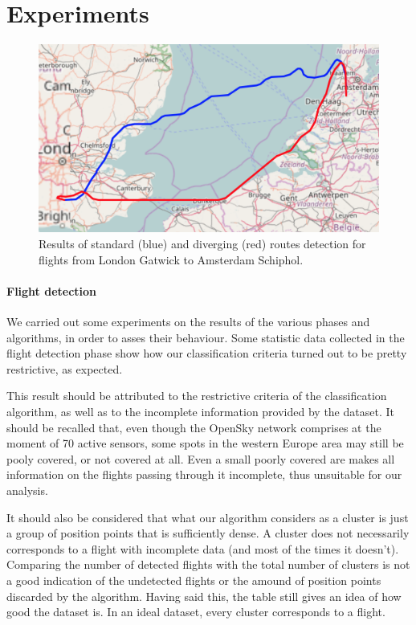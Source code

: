 \documentclass{vldb}
\begin{document}
\section{Experiments}

\begin{figure}[t]
  \centering
  \includegraphics[scale=0.4]{imgs/gatwick-schiphol.png}
  \caption{Results of standard (blue) and diverging (red) routes detection for
    flights from London Gatwick to Amsterdam Schiphol.}
  \label{fig:gatwick-schiphol}
\end{figure}

\paragraph{Flight detection}

We carried out some experiments on the results of the various phases and
algorithms, in order to asses their behaviour. Some statistic data collected in
the flight detection phase show how our classification criteria turned out to be
pretty restrictive, as expected.

This result should be attributed to the restrictive criteria of the
classification algorithm, as well as to the incomplete information provided by
the dataset. It should be recalled that, even though the OpenSky network
comprises at the moment of 70 active sensors, some spots in the western Europe
area may still be pooly covered, or not covered at all. Even a small poorly
covered are makes all information on the flights passing through it incomplete,
thus unsuitable for our analysis.

It should also be considered that what our algorithm considers as a cluster is
just a group of position points that is sufficiently dense. A cluster does not
necessarily corresponds to a flight with incomplete data (and most of the times
it doesn't). Comparing the number of detected flights with the total number of
clusters is not a good indication of the undetected flights or the amound of
position points discarded by the algorithm.
Having said this, the table still gives an idea of how good the dataset is. In
an ideal dataset, every cluster corresponds to a flight.
\end{document}

